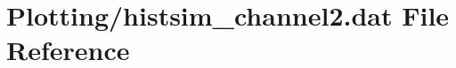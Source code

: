 \hypertarget{Plotting_2histsim__channel2_8dat}{}\section{Plotting/histsim\+\_\+channel2.dat File Reference}
\label{Plotting_2histsim__channel2_8dat}
